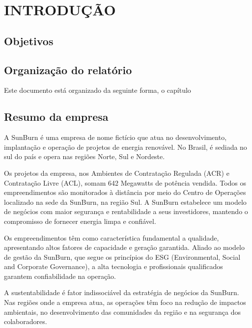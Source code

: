 \chapter{INTRODUÇÃO}
\label{chap:intro}

\section{Objetivos}
\label{sec:obj}

\section{Organização do relatório}
\label{sec:org}
Este documento está organizado da seguinte forma, o capítulo 

\section{Resumo da empresa}
\label{sec:rese}
A SunBurn é uma empresa de nome fictício que atua no desenvolvimento, implantação e operação de projetos de energia renovável. No Brasil, é sediada no sul do país e opera nas regiões Norte, Sul e Nordeste.

Os projetos da empresa, nos Ambientes de Contratação Regulada (ACR) e Contratação Livre (ACL), somam 642 Megawatts de potência vendida. Todos os empreendimentos são monitorados à distância por meio do Centro de Operações localizado na sede da SunBurn, na região Sul.
A SunBurn estabelece um modelo de negócios com maior segurança e rentabilidade a seus investidores, mantendo o compromisso de fornecer energia limpa e confiável.

Os empreendimentos têm como característica fundamental a qualidade, apresentando altos fatores de capacidade e geração garantida. Aliado ao modelo de gestão da SunBurn, que segue os princípios do ESG (Environmental, Social and Corporate Governance), a alta tecnologia e profissionais qualificados garantem confiabilidade na operação.

A sustentabilidade é fator indissociável da estratégia de negócios da SunBurn. Nas regiões onde a empresa atua, as operações têm foco na redução de impactos ambientais, no desenvolvimento das comunidades da região e na segurança dos colaboradores.




